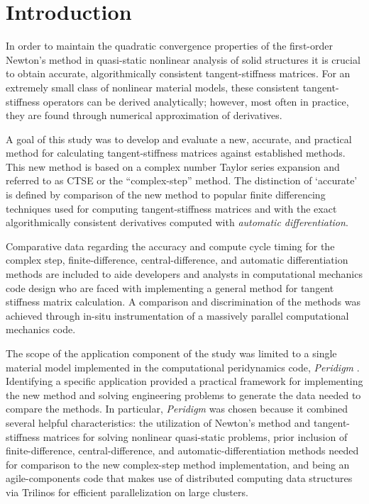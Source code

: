 \documentclass[preprint,12pt]{elsarticle}
\begin{document}


\section{Introduction}
\label{sec:intro} 

In order to maintain the quadratic convergence properties of the first-order Newton's method \cite{belytschko1999nonlinear} \cite[Ch.~13]{young2009} in quasi-static nonlinear analysis of solid structures it is crucial to obtain accurate, algorithmically consistent tangent-stiffness matrices. For an extremely small class of nonlinear material models, these consistent tangent-stiffness operators can be derived analytically; however, most often in practice, they are found through numerical approximation of derivatives. 

A goal of this study was to develop and evaluate a new, accurate, and practical method for calculating tangent-stiffness matrices against established methods.  This new method is based on a complex number Taylor series expansion and referred to as CTSE or the ``complex-step'' method.  The
distinction of `accurate' is defined by comparison of the new method to popular finite differencing techniques used for computing tangent-stiffness matrices and with the exact algorithmically consistent derivatives computed with \emph{automatic differentiation}.

Comparative data regarding the accuracy and compute cycle timing for the complex step, finite-difference, central-difference, and automatic differentiation methods are included to aide developers and analysts in computational mechanics code design who are faced with implementing a general method for tangent stiffness matrix calculation.  A comparison and discrimination of the methods was achieved through in-situ instrumentation of a massively parallel computational mechanics code.   

The scope of the application component of the study was limited to a single material model implemented in the computational peridynamics code, \textit{Peridigm} \cite{peridigm}. Identifying a specific application provided a practical framework for implementing the new method and solving engineering problems to generate the data needed to compare the methods. In particular, \emph{Peridigm} was chosen because it combined several helpful characteristics: the utilization of Newton's method and tangent-stiffness matrices for solving nonlinear quasi-static problems, prior inclusion of finite-difference, central-difference, and automatic-differentiation methods needed for comparison to the new complex-step method implementation, and being an agile-components code that makes use of distributed computing data structures via Trilinos \cite{trilinos} for efficient parallelization on large clusters.
\end{document}
